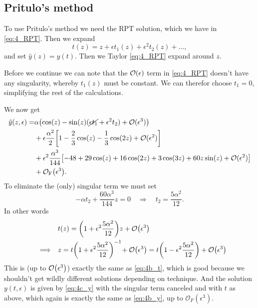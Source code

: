 \documentclass[11pt,letter, swedish, english
]{article}
\begin{document}
\subsection{Pritulo's method}
\newcommand{\hy}{\ensuremath{\hat{y}}}
To use Pritulo's method we need the RPT solution, which we have in
\eqref{eq:4_RPT}. Then we expand
\begin{equation}
t(z)=z+\epsilon t_1(z)+\epsilon^2t_2(z)+\ldots,
\end{equation}
and set $\hy(z)=y(t)$. Then we Taylor \eqref{eq:4_RPT} expand around
$z$.  

Before we continue we can note that the $\order{\epsilon}$ term in
\eqref{eq:4_RPT} doesn't have any singularity, whereby $t_1(z)$ must be
constant. We can therefor choose $t_1=0$, simplifying the rest of the
calculations. 

We now get
\begin{equation}\label{eq:4c_y}
\begin{aligned}
\hy(z, \epsilon)=&\alpha\qty(\cos(z)-\sin(z)(\cancel{\epsilon t_1}+\epsilon^2t_2)+\order*{\epsilon^3})\\
&+\epsilon\frac{\alpha^2}{2}
\qty[1-\frac{2}{3}\cos(z)-\frac{1}{3}\cos(2z) + \order*{\epsilon^2}]\\
&+\epsilon^2\frac{\alpha^3}{144}
\qty[-48+29\cos(z)+16\cos(2z)+3\cos(3z)+60z\sin(z)+ \order*{\epsilon^2}]\\
&+\mathcal{O}_\text{F}\qty(\epsilon^3).
\end{aligned}
\end{equation}
To eliminate the (only) singular term we must set
\begin{equation}
-\alpha t_2+\frac{60\alpha^3}{144}z=0
\quad\Longrightarrow\quad
t_2=\frac{5\alpha^2}{12}.
\end{equation}
In other words 
\begin{equation}
\begin{aligned}
&t(z)=\qty(1+\epsilon^2\frac{5\alpha^2}{12})z+\order{\epsilon^3}\\
\quad\Longrightarrow\quad&
z=t\qty(1+\epsilon^2\frac{5\alpha^2}{12})^{-1}\!+\order{\epsilon^3}
=t\qty(1-\epsilon^2\frac{5\alpha^2}{12})+\order{\epsilon^3}
\end{aligned}
\end{equation}
This is (up to $\order{\epsilon^3}$) exactly the same as
\eqref{eq:4b_t}, which is good because we shouldn't get wildly
different solutions depending on technique. And the solution
$y(t,\epsilon)$ is given by \eqref{eq:4c_y} with the singular term
canceled and with $t$ as above, which again is exactly the same as 
\eqref{eq:4b_y}, up to $\mathcal{O}_F(\epsilon^3)$.
\end{document}
